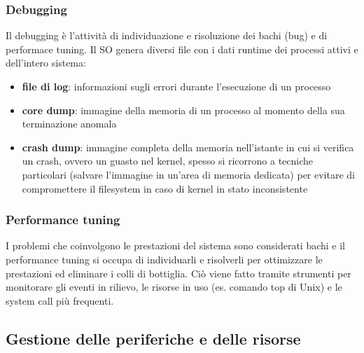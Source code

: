 \documentclass[a4paper]{article}
\begin{document}
\subsubsection*{Debugging}
Il debugging è l'attività di individuazione e risoluzione dei bachi (bug) e di performace tuning. Il SO genera diversi file con
i dati runtime dei processi attivi e dell'intero sistema:
\begin{itemize}
	\item \textbf{file di log}: informazioni sugli errori durante l'esecuzione di un processo
	\item \textbf{core dump}: immagine della memoria di un processo al momento della sua terminazione anomala
	\item \textbf{crash dump}: immagine completa della memoria nell'istante in cui si verifica un crash, ovvero un guasto nel kernel,
	spesso si ricorrono a tecniche particolari (salvare l'immagine in un'area di memoria dedicata) per evitare di compromettere
	il filesystem in caso di kernel in stato inconsistente
\end{itemize}

\subsubsection*{Performance tuning}
I problemi che coinvolgono le prestazioni del sistema sono considerati bachi e il performance tuning si occupa di individuarli
e risolverli per ottimizzare le prestazioni ed eliminare i colli di bottiglia. Ciò viene fatto tramite strumenti per monitorare
gli eventi in rilievo, le risorse in uso (es. comando top di Unix) e le system call più frequenti.

\newpage


\subsection{Gestione delle periferiche e delle risorse}
\end{document}
